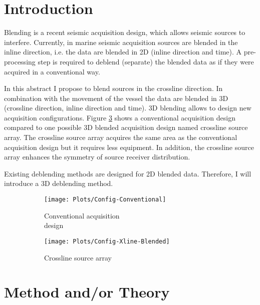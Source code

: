 \documentclass{madrid15WS}
\begin{document}
\section{Introduction}

Blending is a recent seismic acquisition design, which allows seismic sources to interfere. Currently, in marine seismic acquisition sources are blended in the inline direction, i.e. the data are blended in 2D (inline direction and time). A pre-processing step is required to deblend (separate) the blended data as if they were acquired in a conventional way. 

In this abstract I propose to blend sources in the crossline direction. In combination with the movement of the vessel the data are blended in 3D (crossline direction, inline direction and time). 3D blending allows to design new acquisition configurations. Figure \ref{fig:Intro-Configs} shows a conventional acquisition design compared to one possible 3D blended acquisition design named crossline source array. The crossline source array acquires the same area as the conventional acquisition design but it requires less equipment. In addition, the crossline source array enhances the symmetry of source receiver distribution.

Existing deblending methods are designed for 2D blended data. Therefore, I will introduce a 3D deblending method. 

\begin{figure}[h!]
	\centering
	\begin{subfigure}[t]{0.3\textwidth}
		\centering
		\texttt{[image: Plots/Config-Conventional]}
		\caption{Conventional acquisition \\design}
		\label{fig:Intro-Config-Conventional}
	\end{subfigure}
	\qquad \qquad 
	\centering
	\begin{subfigure}[t]{0.3\textwidth}
		\centering
		\texttt{[image: Plots/Config-Xline-Blended]}
		\caption{Crossline source array}
		\label{fig:Intro-Config-Xline-Blended}
	\end{subfigure}
	
	\caption{}
	\label{fig:Intro-Configs}
	
\end{figure}


\section{Method and/or Theory}
\end{document}

